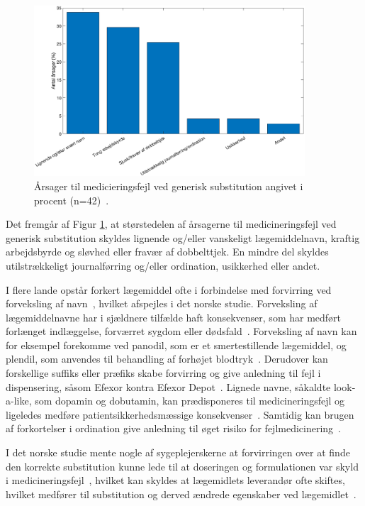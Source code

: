 \begin{figure}[H]\centering	\includegraphics[width=0.9\textwidth]{billeder/GenSubbb.png} 
	\caption{Årsager til medicieringsfejl ved generisk substitution angivet i procent (n=42)~\citep{Hakonsen2010}.}	\label{fig:GeneriskSubstitution1}  
\end{figure}

Det fremgår af Figur \ref{fig:GeneriskSubstitution1}, at størstedelen af årsagerne til medicineringsfejl ved generisk substitution skyldes lignende og/eller vanskeligt lægemiddelnavn, kraftig arbejdsbyrde og sløvhed eller fravær af dobbelttjek. En mindre del skyldes utilstrækkeligt journalførring og/eller ordination, usikkerhed eller andet. 

I flere lande opstår forkert lægemiddel ofte i forbindelse med forvirring ved forveksling af navn~\citep{DanskSelskabforPatientsikkerhed2009}, hvilket afspejles i det norske studie. Forveksling af lægemiddelnavne har i sjældnere tilfælde haft konsekvenser, som har medført forlænget indlæggelse, forværret sygdom eller dødsfald~\citep{DanskSelskabforPatientsikkerhed2009}. Forveksling af navn kan for eksempel forekomme ved panodil, som er et smertestillende lægemiddel, og plendil, som anvendes til behandling af forhøjet blodtryk~\citep{DanskSelskabforPatientsikkerhed2009}. Derudover kan forskellige suffiks eller præfiks skabe forvirring og give anledning til fejl i dispensering, såsom Efexor kontra Efexor Depot~\citep{DanskSelskabforPatientsikkerhed2009}. Lignede navne, såkaldte look-a-like, som dopamin og dobutamin, kan prædisponeres til medicineringsfejl og ligeledes medføre patientsikkerhedsmæssige konsekvenser~\citep{Wittich2014}. Samtidig kan brugen af forkortelser i ordination give anledning til øget risiko for fejlmedicinering~\citep{Wittich2014}.

I det norske studie mente nogle af sygeplejerskerne at forvirringen over at finde den korrekte substitution kunne lede til at doseringen og formulationen var skyld i medicineringsfejl~\citep{Hakonsen2010}, hvilket kan skyldes at lægemidlets leverandør ofte skiftes, hvilket medfører til substitution og derved ændrede egenskaber ved lægemidlet~\citep{Wittich2014}.

